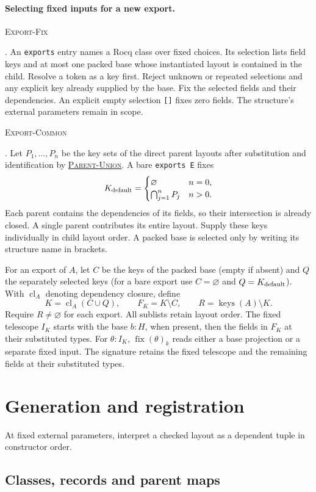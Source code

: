 \documentclass{article}
\newcommand{\ttt}[1]{\texttt{#1}}
\newcommand{\keys}{\operatorname{keys}}
\newcommand{\cl}{\operatorname{cl}}
\newcommand{\rdefn}[1]{\hypertarget{rule-#1}{\textsc{#1}}}
\newcommand{\ruse}[1]{\hyperlink{rule-#1}{\textsc{#1}}}
\begin{document}
\paragraph{Selecting fixed inputs for a new export.}

\rdefn{Export-Fix}. An \ttt{exports} entry names a Rocq class over fixed
choices. Its selection lists field keys and at most one packed base whose
instantiated layout is contained in the child. Resolve a token as a key
first. Reject unknown or repeated selections and any explicit key already
supplied by the base. Fix the selected fields and their dependencies.
An explicit empty selection \ttt{[]} fixes zero fields. The structure's
external parameters remain in scope.

\rdefn{Export-Common}. Let $P_1,\ldots,P_n$ be the key sets of the direct
parent layouts after substitution and identification by \ruse{Parent-Union}.
A bare \ttt{exports E} fixes
\[
 K_{\rm default} =
 \begin{cases}
   \varnothing & n=0,\\
   \bigcap_{j=1}^{n}P_j & n>0 .
 \end{cases}
\]
Each parent contains the dependencies of its fields, so their intersection
is already closed. A single parent contributes its entire layout.
Supply these keys individually in child layout order. A packed base
is selected only by writing its structure name in brackets.

For an export of $A$, let $C$
be the keys of the packed base (empty if absent) and $Q$ the separately
selected keys (for a bare export use $C=\varnothing$ and
$Q=K_{\rm default}$). With $\cl_A$ denoting dependency closure, define
\[
 K=\cl_A(C\cup Q),\qquad F_K=K\setminus C,\qquad R=\keys(A)\setminus K.
\]
Require $R\ne\varnothing$ for each export. All sublists retain layout order. The fixed telescope $I_K$ starts with
the base $b:H$, when present, then the fields in $F_K$ at their substituted
types. For $\theta:I_K$, $\operatorname{fix}(\theta)_k$ reads either a
base projection or a separate fixed input. The signature retains the
fixed telescope and the remaining fields at their substituted types.

\section{Generation and registration}
\label{sec:generation}
At fixed external parameters, interpret a checked layout as a dependent
tuple in constructor order.

\subsection{Classes, records and parent maps}
\end{document}
